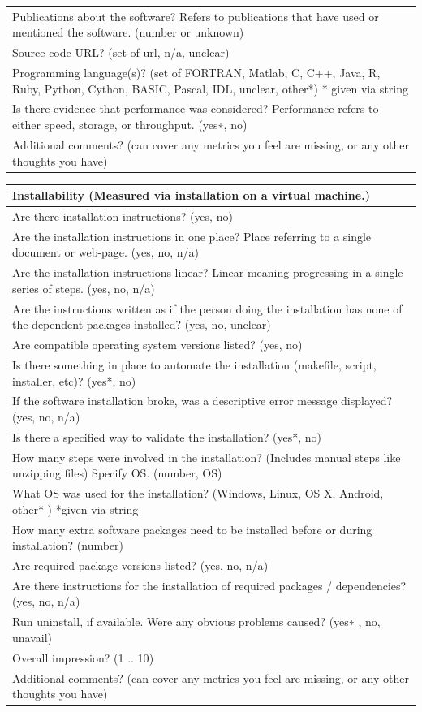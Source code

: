 \documentclass[12pt, notitlepage]{article}
\begin{document}
\begin{singlespace}
\begin{tabular}{p{16cm}}
		Publications about the software? Refers to publications that have used or mentioned the software. (number or {unknown})\\
		Source code URL? ({set of url, n/a, unclear})\\
		Programming language(s)? (set of {FORTRAN, Matlab, C, C++, Java, R, Ruby, Python, Cython, BASIC, Pascal, IDL, unclear, other*}) * given via string \\
		Is there evidence that performance was considered? Performance refers to either speed, storage, or throughput. ({yes∗, no})\\
		Additional comments? (can cover any metrics you feel are missing, or any other thoughts you have) \\
		\hline
\end{tabular}

\def\arraystretch{1.5}
\begin{tabular}{p{16cm}}
		\hline		
		\textbf{Installability  (Measured via installation on a virtual machine.) }\\
		\hline
		Are there installation instructions? ({yes, no})\\
		Are the installation instructions in one place? Place referring to a single document or web-page. ({yes, no, n/a})\\
		Are the installation instructions linear? Linear meaning progressing  in a single series of steps. ({yes, no, n/a})\\
		Are the instructions written as if the person doing the installation has none of the dependent packages installed? ({yes, no, unclear})\\
		Are compatible operating system versions listed? ({yes, no})\\
		Is there something in place to automate the installation (makefile, script, installer, etc)? ({yes*, no})\\
		If the software installation broke, was a descriptive error message displayed? ({yes, no, n/a})\\
		Is there a specified way to validate the installation? ({yes*, no})\\
		How many steps were involved in the installation? (Includes manual steps like unzipping files) Specify OS. (number, OS)\\
		What OS was used for the installation? ({Windows, Linux, OS X, Android, other* }) *given via string\\
		How many extra software packages need to be installed before or during installation? (number)\\
		Are required package versions listed? ({yes, no, n/a})\\
		Are there instructions for the installation of required packages / dependencies? ({yes, no, n/a})\\
		Run uninstall, if available. Were any obvious problems caused? ({yes∗ , no, unavail})\\
		Overall impression? ({1 .. 10})\\
		Additional comments? (can cover any metrics you feel are missing, or any other thoughts you have)\\
		\hline
\end{tabular}


\end{singlespace}
\end{document}
